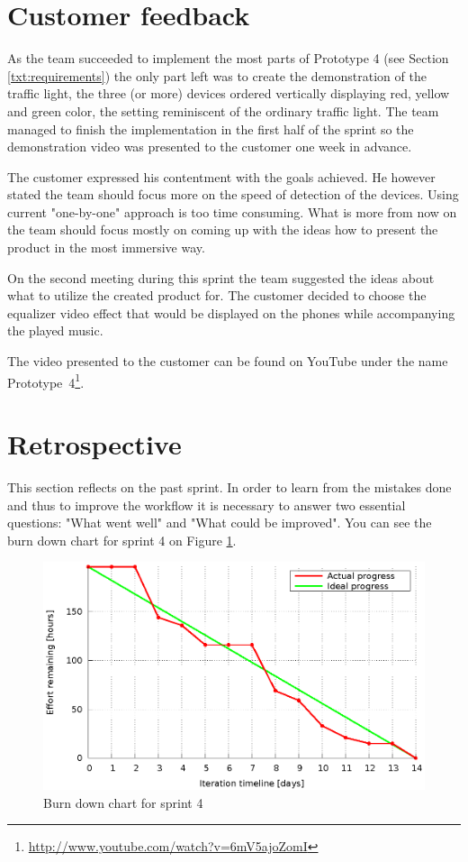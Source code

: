 \section{Customer feedback}
As the team succeeded to implement the most parts of Prototype 4 (see Section \ref{txt:requirements}) the only part left was to create the demonstration of the traffic light, the three (or more) devices ordered vertically displaying red, yellow and green color, the setting reminiscent of the ordinary traffic light. The team managed to finish the implementation in the first half of the sprint so the demonstration video was presented to the customer one week in advance.

The customer expressed his contentment with the goals achieved. He however stated the team should focus more on the speed of detection of the devices. Using current "one-by-one" approach is too time consuming. What is more from now on the team should focus mostly on coming up with the ideas how to present the product in the most immersive way.

On the second meeting during this sprint the team suggested the ideas about what to utilize the created product for. The customer decided to choose the equalizer video effect that would be displayed on the phones while accompanying the played music.

The video presented to the customer can be found on YouTube under the name Prototype~4\footnote{\url{http://www.youtube.com/watch?v=6mV5ajoZomI}}.

\section{Retrospective}
This section reflects on the past sprint. In order to learn from the mistakes done and thus to improve the workflow it is necessary to answer two essential questions: "What went well" and "What could be improved".
You can see the burn down chart for sprint 4 on Figure \ref{fig:Burn4}.

\begin{figure}[h]
	\centering
		\includegraphics[width=14cm]{burndowns/sprint4.eps}
	\caption{Burn down chart for sprint 4}
	\label{fig:Burn4}
\end{figure}

